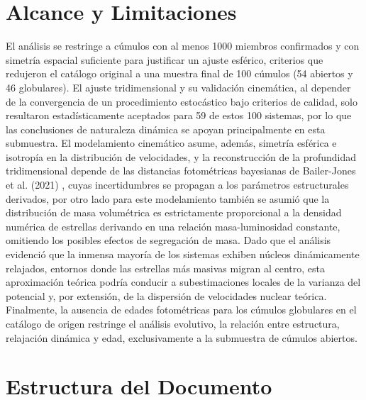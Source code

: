     \section{Alcance y Limitaciones}

        El análisis se restringe a cúmulos con al menos 1000 miembros 
        confirmados y con simetría espacial suficiente para justificar un ajuste 
        esférico, criterios que redujeron el catálogo original a una muestra 
        final de 100 cúmulos (54 abiertos y 46 globulares). El ajuste 
        tridimensional y su validación cinemática, al depender de la 
        convergencia de un procedimiento estocástico bajo criterios de calidad, 
        solo resultaron estadísticamente aceptados para 59 de estos 100 
        sistemas, por lo que las conclusiones de naturaleza dinámica se apoyan 
        principalmente en esta submuestra. El modelamiento cinemático asume, 
        además, simetría esférica e isotropía en la distribución de velocidades, 
        y la reconstrucción de la profundidad tridimensional depende de las 
        distancias fotométricas bayesianas de Bailer-Jones et al. (2021) 
        \cite{bailer2021estimating}, cuyas incertidumbres se propagan a los 
        parámetros estructurales derivados, por otro lado para este modelamiento 
        también se asumió que la distribución de masa volumétrica es 
        estrictamente proporcional a la densidad numérica de estrellas derivando 
        en una relación masa-luminosidad constante, omitiendo los posibles 
        efectos de segregación de masa. Dado que el análisis evidenció que la 
        inmensa mayoría de los sistemas exhiben núcleos dinámicamente relajados, 
        entornos donde las estrellas más masivas migran al centro, esta 
        aproximación teórica podría conducir a subestimaciones locales de la 
        varianza del potencial y, por extensión, de la dispersión de velocidades 
        nuclear teórica. Finalmente, la ausencia de edades fotométricas para los 
        cúmulos globulares en el catálogo de origen restringe el análisis 
        evolutivo, la relación entre estructura, relajación dinámica y edad, 
        exclusivamente a la submuestra de cúmulos abiertos.

    \section{Estructura del Documento}

